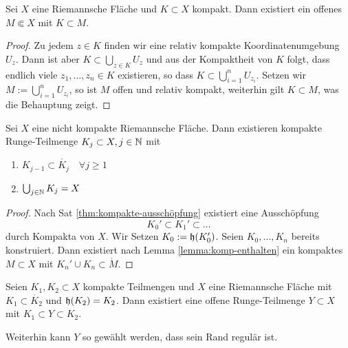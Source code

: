 \begin{lemma}
  \label{lemma:komp-enthalten}
  Sei $X$ eine Riemannsche Fläche und $K \subset X$ kompakt. Dann
  existiert ein offenes $M \Subset X$ mit $K \subset M$.
\end{lemma}

\begin{proof}
  Zu jedem $z \in K$ finden wir eine relativ kompakte
  Koordinatenumgebung $U_z$. Dann ist aber $K \subset \bigcup_{z \in
    K}U_z$ und aus der Kompaktheit von $K$ folgt, dass endlich viele
  $z_1, \dots, z_n \in K$ existieren, so dass $K \subset
  \bigcup_{i=1}^n U_{z_i}$. Setzen wir $M := \bigcup_{i=1}^n U_{z_i}$,
  so ist $M$ offen und relativ kompakt, weiterhin gilt $K \subset M$,
  was die Behauptung zeigt.
\end{proof}

\begin{cor}
  \label{cor:ausschöpfung-kompakt}
  Sei $X$ eine nicht kompakte Riemannsche Fläche. Dann existieren
  kompakte Runge-Teilmenge $K_j \subset X, j \in \mathbb{N}$ mit
  \begin{enumerate}
  \item $K_{j-1} \subset \mathring{K_j} \quad \forall j \geq 1$
  \item $\bigcup_{j\in \mathbb{N}} K_j = X$
  \end{enumerate}
\end{cor}

\begin{proof}
  Nach Sat \ref{thm:kompakte-ausschöpfung} existiert eine 
  Ausschöpfung
  \[
  K_0' \subset K_1' \subset \dots
  \]
  durch Kompakta von $X$. Wir Setzen $K_0 := \mathfrak{h}(K_0')$. Seien
  $K_0, \dots, K_n$ bereits konstruiert. Dann existiert nach Lemma
  \ref{lemma:komp-enthalten} ein
  kompaktes $M \subset X$ mit $K_n' \cup K_n \subset \mathring
  M$. 
\end{proof}

\begin{lemma}
  \label{lemma:zwischen-runge}
  Seien $K_1, K_2 \subset X$ kompakte Teilmengen und $X$ eine
  Riemannsche Fläche mit $K_1 \subset \mathring{K_2}$ und $\mathfrak{h}(K_2)
  = K_2$.
  Dann existiert eine offene Runge-Teilmenge $Y \subset X$ mit $K_1
  \subset Y \subset K_2$.

  Weiterhin kann $Y$ so gewählt werden, dass sein Rand regulär ist.
\end{lemma}

